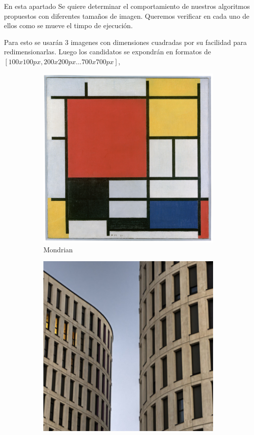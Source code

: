 En esta apartado Se quiere determinar el comportamiento de nuestros algoritmos propuestos con diferentes tamaños de imagen. Queremos verificar en cada uno de ellos como se mueve el timpo de ejecución. 

Para esto se usarán 3 imagenes con dimensiones cuadradas por su facilidad para redimensionarlas. Luego los candidatos se expondrán en formatos de $[100x100px,200x200px...700x700px]$,

\begin{figure}[H]
	\centering
	\begin{subfigure}{0.3\linewidth}
		\includegraphics[width=\linewidth]{segmentation/entradas-posta/mondrian}
		\caption{Mondrian}
	\end{subfigure}
	\begin{subfigure}{0.3\linewidth}
	\includegraphics[width=\linewidth]{segmentation/entradas-posta/edificios}

\end{subfigure}
\end{figure}
